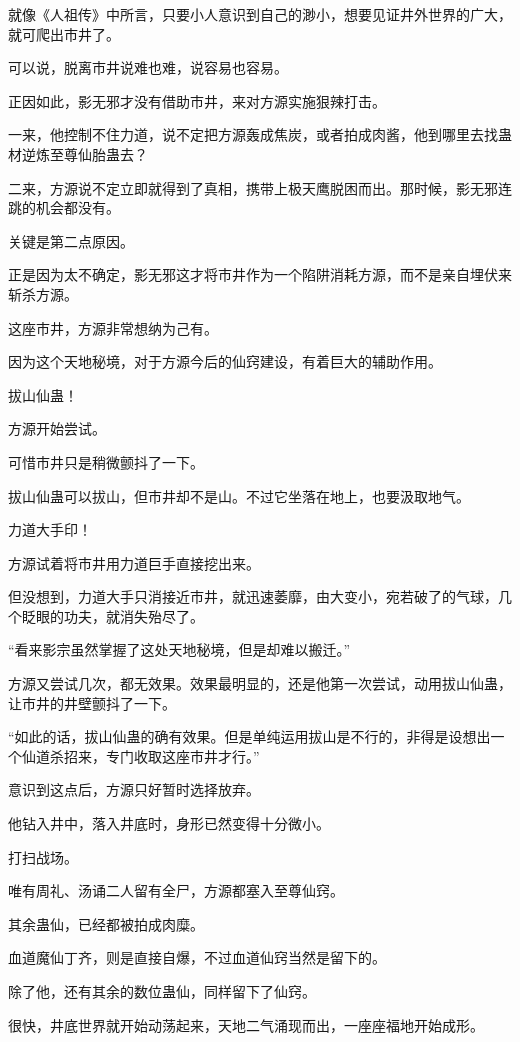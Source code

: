 \begin{this_body}
就像《人祖传》中所言，只要小人意识到自己的渺小，想要见证井外世界的广大，就可爬出市井了。

可以说，脱离市井说难也难，说容易也容易。

正因如此，影无邪才没有借助市井，来对方源实施狠辣打击。

一来，他控制不住力道，说不定把方源轰成焦炭，或者拍成肉酱，他到哪里去找蛊材逆炼至尊仙胎蛊去？

二来，方源说不定立即就得到了真相，携带上极天鹰脱困而出。那时候，影无邪连跳的机会都没有。

关键是第二点原因。

正是因为太不确定，影无邪这才将市井作为一个陷阱消耗方源，而不是亲自埋伏来斩杀方源。

这座市井，方源非常想纳为己有。

因为这个天地秘境，对于方源今后的仙窍建设，有着巨大的辅助作用。

拔山仙蛊！

方源开始尝试。

可惜市井只是稍微颤抖了一下。

拔山仙蛊可以拔山，但市井却不是山。不过它坐落在地上，也要汲取地气。

力道大手印！

方源试着将市井用力道巨手直接挖出来。

但没想到，力道大手只消接近市井，就迅速萎靡，由大变小，宛若破了的气球，几个眨眼的功夫，就消失殆尽了。

“看来影宗虽然掌握了这处天地秘境，但是却难以搬迁。”

方源又尝试几次，都无效果。效果最明显的，还是他第一次尝试，动用拔山仙蛊，让市井的井壁颤抖了一下。

“如此的话，拔山仙蛊的确有效果。但是单纯运用拔山是不行的，非得是设想出一个仙道杀招来，专门收取这座市井才行。”

意识到这点后，方源只好暂时选择放弃。

他钻入井中，落入井底时，身形已然变得十分微小。

打扫战场。

唯有周礼、汤诵二人留有全尸，方源都塞入至尊仙窍。

其余蛊仙，已经都被拍成肉糜。

血道魔仙丁齐，则是直接自爆，不过血道仙窍当然是留下的。

除了他，还有其余的数位蛊仙，同样留下了仙窍。

很快，井底世界就开始动荡起来，天地二气涌现而出，一座座福地开始成形。


\end{this_body}

